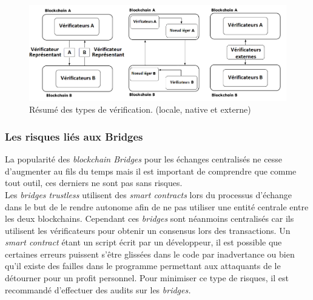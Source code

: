 \begin{figure}[h]
    \centering
\includegraphics[scale=0.60]{centralisation/imagesBridges/DiagrammeResumeVerif.png}
\caption{Résumé des types de vérification. (locale, native et externe)}
\label{fig:LocaleVerif}
\end{figure}

\subsubsection{Les risques liés aux Bridges}

La popularité des \textit{\gls{blockchain} Bridges} pour les échanges centralisés ne cesse d’augmenter au fils du temps mais il est important de comprendre que comme tout outil, ces derniers ne sont pas sans risques. \\

Les \textit{bridges trustless} utilisent des \textit{\gls{smart contract}s} lors du processus d’échange dans le but de le rendre autonome afin de ne pas utiliser une entité centrale entre les deux \gls{blockchain}s. Cependant ces \textit{bridges} sont néanmoins centralisés car ils utilisent les \gls{vérificateur}s pour obtenir un consensus lors des transactions.
Un \textit{\gls{smart contract}} étant un script écrit par un développeur, il est possible que certaines erreurs puissent s’être glissées dans le code par inadvertance ou bien qu’il existe des failles dans le programme permettant aux attaquants de le détourner pour un profit personnel. 
Pour minimiser ce type de risques, il est recommandé d’effectuer des audits sur les \textit{bridges.} \\

